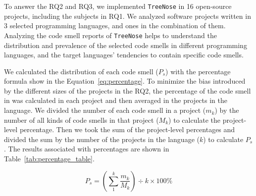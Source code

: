 To answer the RQ2 and RQ3, we implemented \texttt{TreeNose} in 16
open-source projects, including the subjects in RQ1. We analyzed software
projects written in 3 selected programming languages, and ones in the
%
%
combination of them.
%
%
Analyzing the code smell reports of \texttt{TreeNose}
helps to understand the distribution and prevalence of the selected code smells
in different programming languages, and the target languages'
tendencies to contain specific code smells.




We calculated the distribution of each code smell ($P_{s}$) with the percentage
formula show in the Equation~\ref{eq:percentage}. To minimize the bias
introduced by the different sizes of the projects in the RQ2, the percentage of
the code smell in was calculated in each project and then averaged in the
projects in the language. We divided the number of each code smell in a project
($m_{k}$) by the number of all kinds of code smells in that project ({$M_{k}$})
to calculate the project-level percentage. Then we took the sum of the
project-level percentages and divided the sum by the number of the projects in
the language ($k$) to calculate $P_{s}$. The results associated with percentages
are shown in Table~\ref{tab:percentage_table}.


\begin{equation}
P_{s} = \left( \sum_{1}^{k}\frac{{m_{k}}}{M_{k}} \right) \div {k} \times 100\%
\label{eq:percentage}
\end{equation}

